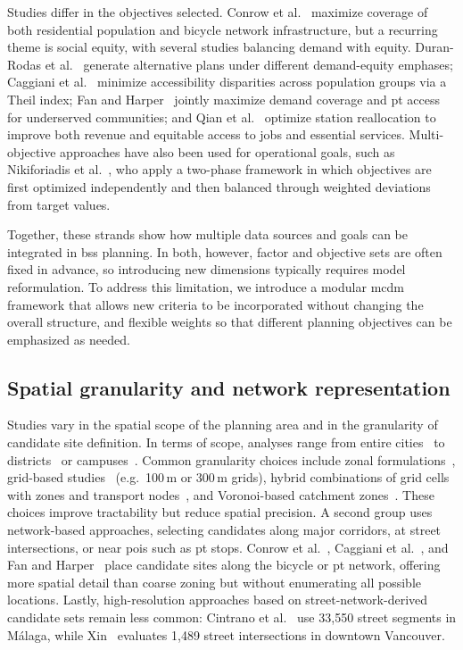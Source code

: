 Studies differ in the objectives selected. Conrow et al.~\cite{Conrow2018} maximize coverage of both residential population and bicycle network infrastructure, but a recurring theme is social equity, with several studies balancing demand with equity. Duran-Rodas et al.~\cite{Duran-Rodas2021} generate alternative plans under different demand-equity emphases; Caggiani et al.~\cite{Caggiani2020} minimize accessibility disparities across population groups via a Theil index; Fan and Harper~\cite{Fan2024} jointly maximize demand coverage and \ac{pt} access for underserved communities; and Qian et al.~\cite{Qian2022} optimize station reallocation to improve both revenue and equitable access to jobs and essential services. Multi-objective approaches have also been used for operational goals, such as Nikiforiadis et al.~\cite{Nikiforiadis2021}, who apply a two-phase framework in which objectives are first optimized independently and then balanced through weighted deviations from target values.

Together, these strands show how multiple data sources and goals can be integrated in \ac{bss} planning. In both, however, factor and objective sets are often fixed in advance, so introducing new dimensions typically requires model reformulation. To address this limitation, we introduce a modular \ac{mcdm} framework that allows new criteria to be incorporated without changing the overall structure, and flexible weights so that different planning objectives can be emphasized as needed.


\subsection{Spatial granularity and network representation}

Studies vary in the spatial scope of the planning area and in the granularity of candidate site definition. In terms of scope, analyses range from entire cities~\cite{Conrow2018, Duran-Rodas2021} to districts~\cite{GarciaPalomares2012} or campuses~\cite{Mete2018}. Common granularity choices include zonal formulations~\cite{Frade2015, Mete2018, Conrow2018}, grid-based studies~\cite{Fazio2021, Tera2023, Veillette2018} (e.g.\ 100\,m or 300\,m grids), hybrid combinations of grid cells with zones and transport nodes~\cite{Nikiforiadis2021}, and Voronoi-based catchment zones~\cite{Duran-Rodas2021}. These choices improve tractability but reduce spatial precision. A second group uses network-based approaches, selecting candidates along major corridors, at street intersections, or near \acp{poi} such as \ac{pt} stops. Conrow et al.~\cite{Conrow2018}, Caggiani et al.~\cite{Caggiani2020}, and Fan and Harper~\cite{Fan2024} place candidate sites along the bicycle or \ac{pt} network, offering more spatial detail than coarse zoning but without enumerating all possible locations. Lastly, high-resolution approaches based on street-network-derived candidate sets remain less common: Cintrano et al.~\cite{Cintrano2018} use 33,550 street segments in Málaga, while Xin~\cite{Xin2013} evaluates 1,489 street intersections in downtown Vancouver.


